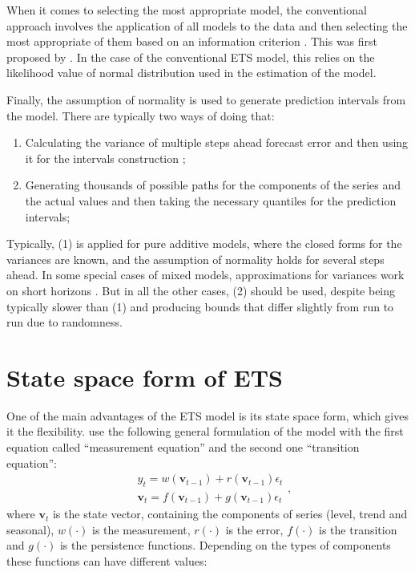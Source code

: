 \documentclass[
]{book}
\providecommand{\tightlist}{%
  \setlength{\itemsep}{0pt}\setlength{\parskip}{0pt}}
\theoremstyle{definition}
\theoremstyle{definition}
\theoremstyle{definition}
\theoremstyle{definition}
\theoremstyle{remark}
\begin{document}
When it comes to selecting the most appropriate model, the conventional approach involves the application of all models to the data and then selecting the most appropriate of them based on an information criterion \citep[see Section 13.4 of][]{SvetunkovSBA}. This was first proposed by \citet{Hyndman2002}. In the case of the conventional ETS model, this relies on the likelihood value of normal distribution used in the estimation of the model.

Finally, the assumption of normality is used to generate prediction intervals from the model. There are typically two ways of doing that:

\begin{enumerate}
\def\labelenumi{\arabic{enumi}.}
\tightlist
\item
  Calculating the variance of multiple steps ahead forecast error and then using it for the intervals construction \citep[see Chapter 6 of][]{Hyndman2008b};
\item
  Generating thousands of possible paths for the components of the series and the actual values and then taking the necessary quantiles for the prediction intervals;
\end{enumerate}

Typically, (1) is applied for pure additive models, where the closed forms for the variances are known, and the assumption of normality holds for several steps ahead. In some special cases of mixed models, approximations for variances work on short horizons \citep[see Section 6.4 of][]{Hyndman2008b}. But in all the other cases, (2) should be used, despite being typically slower than (1) and producing bounds that differ slightly from run to run due to randomness.

\hypertarget{ETSConventionalModel}{%
\section{State space form of ETS}\label{ETSConventionalModel}}

One of the main advantages of the ETS model is its state space form, which gives it the flexibility. \citet{Hyndman2008b} use the following general formulation of the model with the first equation called ``measurement equation'' and the second one ``transition equation'':
\begin{equation}
  \begin{aligned}
  & {y}_{t} = w(\mathbf{v}_{t-1}) + r(\mathbf{v}_{t-1}) \epsilon_t \\
  & \mathbf{v}_{t} = f(\mathbf{v}_{t-1}) + g(\mathbf{v}_{t-1}) \epsilon_t
  \end{aligned},
  \label{eq:ETSConventionalStateSpace}
\end{equation}
where \(\mathbf{v}_t\) is the state vector, containing the components of series (level, trend and seasonal), \(w(\cdot)\) is the measurement, \(r(\cdot)\) is the error, \(f(\cdot)\) is the transition and \(g(\cdot)\) is the persistence functions. Depending on the types of components these functions can have different values:
\end{document}
